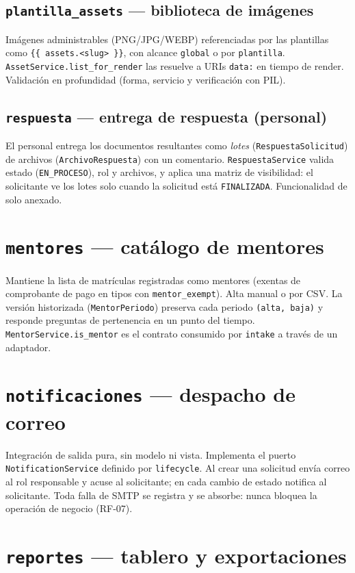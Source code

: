 \documentclass[12pt,letterpaper]{report}
\begin{document}
\subsection{\texttt{plantilla\_assets} — biblioteca de imágenes}
Imágenes administrables (PNG/JPG/WEBP) referenciadas por las plantillas como
\texttt{\{\{ assets.<slug> \}\}}, con alcance \texttt{global} o por
\texttt{plantilla}. \texttt{AssetService.list\_for\_render} las resuelve a URIs
\texttt{data:} en tiempo de render. Validación en profundidad (forma, servicio y
verificación con PIL).

\subsection{\texttt{respuesta} — entrega de respuesta (personal)}
El personal entrega los documentos resultantes como \emph{lotes}
(\texttt{RespuestaSolicitud}) de archivos (\texttt{ArchivoRespuesta}) con un
comentario. \texttt{RespuestaService} valida estado (\texttt{EN\_PROCESO}), rol y
archivos, y aplica una matriz de visibilidad: el solicitante ve los lotes solo
cuando la solicitud está \texttt{FINALIZADA}. Funcionalidad de solo anexado.

\section{\texttt{mentores} — catálogo de mentores}

Mantiene la lista de matrículas registradas como mentores (exentas de
comprobante de pago en tipos con \texttt{mentor\_exempt}). Alta manual o por CSV.
La versión historizada (\texttt{MentorPeriodo}) preserva cada periodo
\texttt{(alta, baja)} y responde preguntas de pertenencia en un punto del tiempo.
\texttt{MentorService.is\_mentor} es el contrato consumido por \texttt{intake} a
través de un adaptador.

\section{\texttt{notificaciones} — despacho de correo}

Integración de salida pura, sin modelo ni vista. Implementa el puerto
\texttt{NotificationService} definido por \texttt{lifecycle}. Al crear una
solicitud envía correo al rol responsable y acuse al solicitante; en cada
cambio de estado notifica al solicitante. Toda falla de SMTP se registra y se
absorbe: nunca bloquea la operación de negocio (RF-07).

\section{\texttt{reportes} — tablero y exportaciones}
\end{document}
